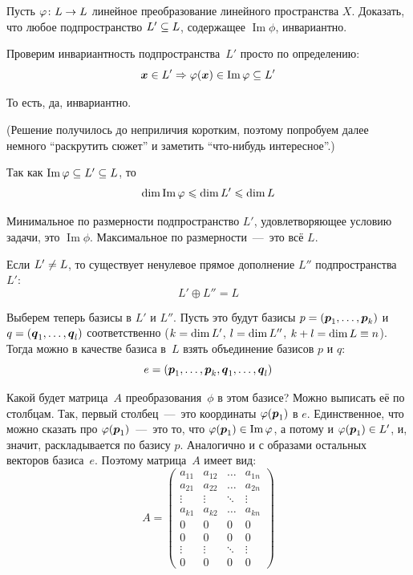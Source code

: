 \documentclass[a4paper,12pt]{article}
\DeclareMathOperator{\Imag}{Im}
\begin{document}
  Пусть $\phi\colon L \hm\to L$ линейное преобразование линейного пространства $X$.
  Доказать, что любое подпространство $L' \hm\subseteq L$, содержащее $\Imag\phi$, инвариантно.
  
  \begin{solution}
    Проверим инвариантность подпространства~$L'$ просто по определению:
    \[
      \bds x \hm\in L' \Rightarrow \phi(\bds x) \in \Imag\phi \subseteq L'
    \]
    
    То есть, да, инвариантно.
    
    (Решение получилось до неприличия коротким, поэтому попробуем далее немного ``раскрутить сюжет'' и заметить ``что-нибудь интересное''.)
    
    Так как $\Imag\phi \hm\subseteq L' \hm\subseteq L$, то
    \[
      \dim\Imag\phi \hm\leq \dim L' \hm\leq \dim L
    \]
    
    Минимальное по размерности подпространство $L'$, удовлетворяющее условию задачи, это $\Imag\phi$.
    Максимальное по размерности~---~это всё $L$.
    
    Если $L' \hm{\not=} L$, то существует ненулевое прямое дополнение $L''$ подпространства $L'$:
    \[
      L' \oplus L'' = L
    \]
    
    Выберем теперь базисы в $L'$ и $L''$.
    Пусть это будут базисы $p = (\boldsymbol p_1, \ldots, \boldsymbol p_k)$ и $q \hm= (\bds q_1, \ldots, \bds q_l)$ соответственно ($k \hm= \dim L'$, $l \hm= \dim L''$, $k \hm+ l \hm= \dim L \hm\equiv n$).
    Тогда можно в качестве базиса в~$L$ взять объединение базисов $p$ и $q$:
    \[
      e = (\boldsymbol p_1, \ldots, \boldsymbol p_k, \boldsymbol q_1, \ldots, \boldsymbol q_l)
    \]
    
    Какой будет матрица~$A$ преобразования~$\phi$ в этом базисе?
    Можно выписать её по столбцам.
    Так, первый столбец~---~это координаты $\varphi(\boldsymbol p_1)$ в $e$.
    Единственное, что можно сказать про $\varphi(\boldsymbol p_1)$~---~это то, что $\phi(\bds p_1) \hm\in \Imag\phi$, а потому и $\phi(\bds p_1) \hm\in L'$, и, значит, раскладывается по базису $p$.
    Аналогично и с образами остальных векторов базиса~$e$.
    Поэтому матрица~$A$ имеет вид:
    \[
      A = \begin{pmatrix}
        a_{11} & a_{12} & \ldots & a_{1n}\\
        a_{21} & a_{22} & \ldots & a_{2n}\\
        \vdots & \vdots & \ddots & \vdots\\
        a_{k1} & a_{k2} & \ldots & a_{kn}\\
        0      & 0      & 0      & 0\\
        0      & 0      & 0      & 0\\
        \vdots & \vdots & \ddots & \vdots\\
        0      & 0      & 0      & 0
      \end{pmatrix}
    \]
    

\end{solution}
\end{document}
